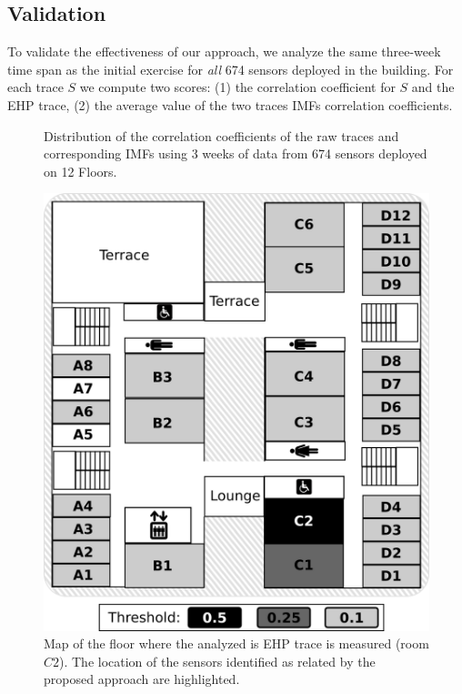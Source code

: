 \subsection{Validation}
To validate the effectiveness of our approach, we analyze the same three-week time span as the
initial exercise for \emph{all} 674 sensors deployed in the building.
For each trace $S$ we compute two scores: (1) the correlation coefficient for $S$ and the EHP trace, (2) the average value of the two traces IMFs correlation coefficients.

\begin{figure}[tbh!]
\centering
 \caption{Distribution of the correlation coefficients of the raw traces and corresponding IMFs using 3 weeks of data from 674 sensors deployed on 12 Floors.}
\label{fig:histo}
\end{figure}

\begin{figure}
\includegraphics[width=.5\textwidth]{img/floorMap.png}
\caption{Map of the floor where the analyzed is EHP trace is measured (room $C2$). The location of the sensors identified as related by the proposed approach are highlighted.}
\label{fig:map}
\end{figure}

